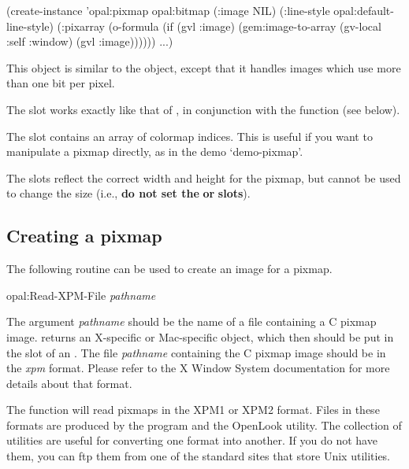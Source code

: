 \begin{programexample}
 
(create-instance 'opal:pixmap opal:bitmap
  (:image NIL)
  (:line-style opal:default-line-style)
  (:pixarray (o-formula (if (gvl :image)
			    (gem:image-to-array (gv-local :self :window)
						(gvl :image))))))
  ...)

\end{programexample}

This object is similar to the  object, except that it handles
images which use more than one bit per pixel.

The  slot works exactly like that of
, in conjunction with the function 
(see below).

The  slot contains an array of colormap indices.
This is useful if you want to manipulate a pixmap directly,
as in the demo `demo-pixmap'.

The  slots reflect the correct width and
height for the pixmap, but cannot be used to change the size (i.e.,
{\bf do not set the}  {\bf or}  {\bf slots}).


\subsection{Creating a pixmap}

The following routine can be used to create an image for a pixmap.

\begin{programexample}
opal:Read-XPM-File {\it pathname} \value{function}
\end{programexample}

The argument {\it pathname} should be the name of a file containing a C
pixmap image.   returns an X-specific or Mac-specific
object, which then should be put in the  slot of an
.  The file {\it pathname} containing the C pixmap image
should be in the {\it xpm} format.  Please refer to the X Window System
documentation for more details about that format.

The function  will read pixmaps in the XPM1 or XPM2 format.
Files in these formats are produced by the program  and the
OpenLook  utility.  The  collection of
utilities are useful for converting one format into another.  If you
do not have them, you can {\sc ftp} them from one of the standard sites that
store Unix utilities.

